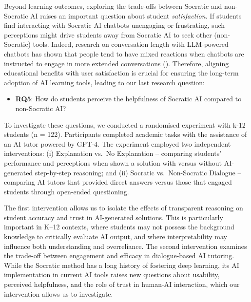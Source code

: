 \documentclass[
  11pt,
]{article}
\providecommand{\tightlist}{%
  \setlength{\itemsep}{0pt}\setlength{\parskip}{0pt}}
\begin{document}
Beyond learning outcomes, exploring the trade-offs between Socratic and non-Socratic AI raises an important question about student \emph{satisfaction}. If students find interacting with Socratic AI chatbots unengaging or frustrating, such perceptions might drive students away from Socratic AI to seek other (non-Socratic) tools. Indeed, research on conversation length with LLM-powered chatbots has shown that people tend to have mixed reactions when chatbots are instructed to engage in more extended conversations (). Therefore, aligning educational benefits with user satisfaction is crucial for ensuring the long-term adoption of AI learning tools, leading to our last research question:

\begin{itemize}
\tightlist
\item
  \textbf{RQ5}: How do students perceive the helpfulness of Socratic AI compared to non-Socratic AI?
\end{itemize}

To investigate these questions, we conducted a randomised experiment with k-12 students (n = 122). Participants completed academic tasks with the assistance of an AI tutor powered by GPT-4. The experiment employed two independent interventions: (i) Explanation vs.~No Explanation -- comparing students' performance and perceptions when shown a solution with versus without AI-generated step-by-step reasoning; and (ii) Socratic vs.~Non-Socratic Dialogue -- comparing AI tutors that provided direct answers versus those that engaged students through open-ended questioning.

The first intervention allows us to isolate the effects of transparent reasoning on student accuracy and trust in AI-generated solutions. This is particularly important in K--12 contexts, where students may not possess the background knowledge to critically evaluate AI output, and where interpretability may influence both understanding and overreliance. The second intervention examines the trade-off between engagement and efficacy in dialogue-based AI tutoring. While the Socratic method has a long history of fostering deep learning, its AI implementation in current AI tools raises new questions about usability, perceived helpfulness, and the role of trust in human-AI interaction, which our intervention allows us to investigate.
\end{document}
